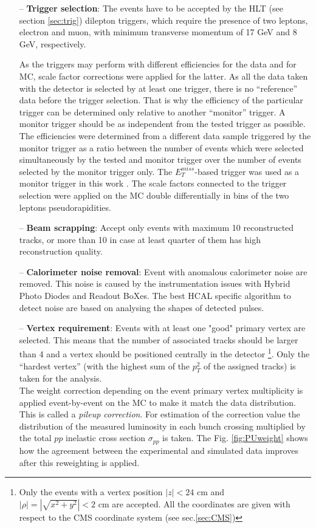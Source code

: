 \begin{itemize}
 \item [--] \textbf{Trigger selection}: The events have to be accepted by the HLT (see section \ref{sec:trig}) dilepton triggers, which require the presence of two leptons, electron and muon, with
 minimum transverse momentum of 17 GeV and 8 GeV, respectively.
 
 As the triggers may perform with different efficiencies for the data and for MC, scale factor corrections were applied for the latter. As all the data taken with 
 the detector is selected by at least one trigger, there is no ``reference'' data before the trigger selection. That is why the efficiency of the particular trigger 
 can be determined only relative to another ``monitor'' trigger. A monitor trigger should be as independent from the tested trigger as possible. The efficiencies
 were determined from a different data sample triggered by the monitor trigger as a ratio between the number of events which were selected simultaneously by the 
 tested and monitor trigger over the number of events selected by the monitor trigger only. The $E_{T}^{miss}$-based trigger was used as a monitor trigger in this 
 work \cite{Asin2014Auth}. The scale factors connected to the trigger selection were applied on the MC double differentially in bins of the two leptons pseudorapidities. 
 \item [--] \textbf{Beam scrapping}: Accept only events with maximum 10 reconstructed tracks, or more than 10 in case at least quarter of them has high reconstruction 
 quality.
 \item [--] \textbf{Calorimeter noise removal}: Event with anomalous calorimeter noise are removed\cite{HCALNoise}. This noise is caused by the instrumentation issues with Hybrid 
 Photo Diodes and Readout BoXes. The best HCAL specific algorithm to detect noise are based on analysing the shapes of detected pulses.
 \item [--] \textbf{Vertex requirement}: Events with at least one "good" primary vertex are selected.
 This means that the number of associated tracks should be larger than 4 and a vertex should be positioned centrally in the detector
 \footnote{Only the events with a vertex position $|z| < \textrm{24 cm}$ and $|\rho| = |\sqrt{x^{2} + y^{2}}| < \textrm{2 cm}$ are accepted. All the coordinates
 are given with respect to the CMS coordinate system (see sec.\ref{sec:CMS})}. Only the ``hardest vertex'' 
 (with the highest sum of the $p_{T}^{2}$ of the assigned tracks) is taken for the analysis. 
 \\
 The weight correction depending on the event primary vertex multiplicity is applied
 event-by-event on the MC to make it match the data distribution. This is called a \textit{pileup correction}. For estimation of the correction value
 the distribution of the measured luminosity in each bunch crossing \cite{CMS:2012rua}
 multiplied by the total $pp$ inelastic cross section $\sigma_{pp}$ \cite{TWikiSystPU} is taken.
 The Fig. \ref{fig:PUweight} shows how the agreement
 between the experimental and simulated data improves after this reweighting is applied.
 

\end{itemize}
